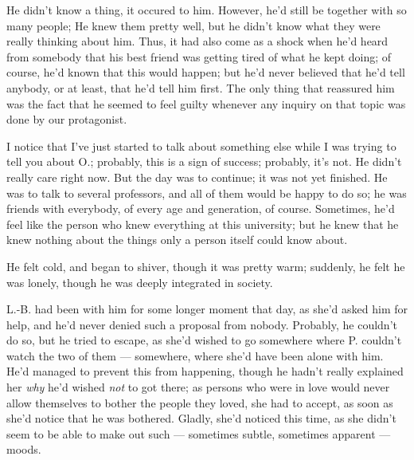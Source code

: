 He didn't know a thing, it occured to him. However, he'd still be together with so many people; He knew them pretty well, but he didn't know what they were really thinking about him. Thus, it had also come as a shock when he'd heard from somebody that his best friend was getting tired of what he kept doing; of course, he'd known that this would happen; but he'd never believed that he'd tell anybody, or at least, that he'd tell him first. The only thing that reassured him was the fact that he seemed to feel guilty whenever any inquiry on that topic was done by our protagonist.

I notice that I've just started to talk about something else while I was trying to tell you about O.; probably, this is a sign of success; probably, it's not. He didn't really care right now. 
But the day was to continue; it was not yet finished. He was to talk to several professors, and all of them would be happy to do so; he was friends with everybody, of every age and generation, of course. Sometimes, he'd feel like the person who knew everything at this university; but he knew that he knew nothing about the things only a person itself could know about.

He felt cold, and began to shiver, though it was pretty warm; suddenly, he felt he was lonely, though he was deeply integrated in society.

L.-B. had been with him for some longer moment that day, as she'd asked him for help, and he'd never denied such a proposal from nobody. Probably, he couldn't do so, but he tried to escape, as she'd wished to go somewhere where P. couldn't watch the two of them --- somewhere, where she'd have been alone with him. He'd managed to prevent this from happening, though he hadn't really explained her \emph{why} he'd wished \emph{not} to got there; as persons who were in love would never allow themselves to bother the people they loved, she had to accept, as soon as she'd notice that he was bothered. Gladly, she'd noticed this time, as she didn't seem to be able to make out such --- sometimes subtle, sometimes apparent --- moods.

